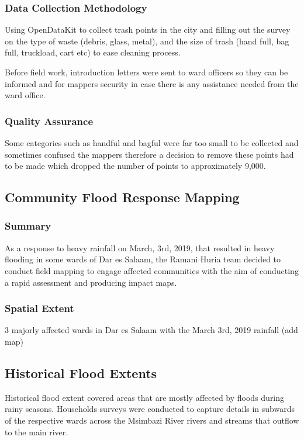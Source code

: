 \documentclass[a4paper,12pt,twoside]{article}
\begin{document}
\subsubsection{Data Collection Methodology}
Using OpenDataKit to collect trash points in the city and filling out the survey on the type of waste (debris, glass, metal), and the size of trash (hand full, bag full, truckload, cart etc) to ease cleaning process.

Before field work, introduction letters were sent to ward officers so they can be informed and for mappers security in case there is any assistance needed from the ward office.

\subsubsection{Quality Assurance}
Some categories such as handful and bagful were far too small to be collected and sometimes confused the mappers therefore a decision to remove these points had to be made which dropped the number of points to approximately 9,000.

\newpage
\subsection{Community Flood Response Mapping}
\subsubsection{Summary}
As a response to heavy rainfall on March, 3rd, 2019, that resulted in heavy flooding in some wards of Dar es Salaam, the Ramani Huria team decided to conduct field mapping to engage affected communities with the aim of conducting a rapid assessment and producing impact maps.
\subsubsection{Spatial Extent}
3 majorly affected wards in Dar es Salaam with the March 3rd, 2019 rainfall (add map)

\newpage
\subsection{Historical Flood Extents}

Historical flood extent covered areas that are mostly affected by floods during rainy seasons. Households surveys were conducted to capture details in  subwards of the respective wards across the Msimbazi River rivers and streams that outflow to the main river.
\end{document}
